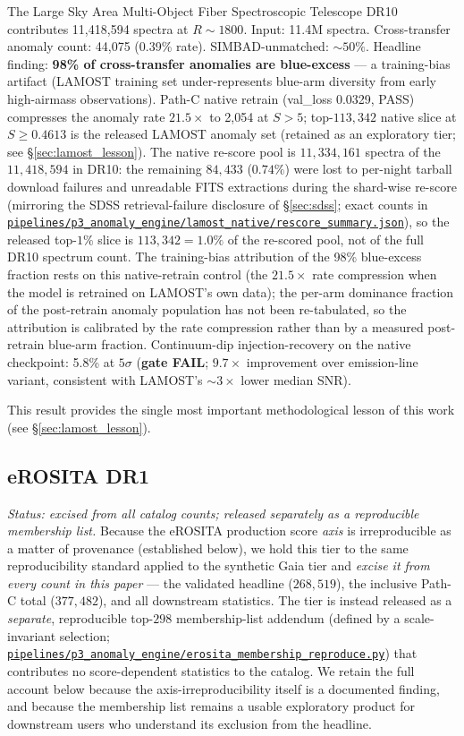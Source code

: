 \documentclass[aps,prd,twocolumn,superscriptaddress,showpacs,preprintnumbers,nofootinbib,longbibliography,floatfix]{revtex4-2}
\newcommand{\repoBase}{https://github.com/Hubify-Projects/bigbounce/blob/main}
\newcommand{\artifact}[1]{\href{\repoBase/#1}{\nolinkurl{#1}}}
\begin{document}
The Large Sky Area Multi-Object Fiber Spectroscopic Telescope DR10~\cite{LAMOST_DR10} contributes 11{,}418{,}594 spectra at $R \sim 1800$. Input: 11.4M spectra. Cross-transfer anomaly count: 44{,}075 (0.39\% rate). SIMBAD-unmatched: $\sim\!50\%$. Headline finding: \textbf{98\% of cross-transfer anomalies are blue-excess} --- a training-bias artifact (LAMOST training set under-represents blue-arm diversity from early high-airmass observations). Path-C native retrain (val\_loss 0.0329, PASS) compresses the anomaly rate $21.5\times$ to 2{,}054 at $S>5$; top-$113{,}342$ native slice at $S \geq 0.4613$ is the released LAMOST anomaly set (retained as an exploratory tier; see \S\ref{sec:lamost_lesson}). The native re-score pool is $11{,}334{,}161$ spectra of the $11{,}418{,}594$ in DR10: the remaining $84{,}433$ ($0.74\%$) were lost to per-night tarball download failures and unreadable FITS extractions during the shard-wise re-score (mirroring the SDSS retrieval-failure disclosure of \S\ref{sec:sdss}; exact counts in \artifact{pipelines/p3\_anomaly\_engine/lamost\_native/rescore\_summary.json}), so the released top-$1\%$ slice is $113{,}342 = 1.0\%$ of the re-scored pool, not of the full DR10 spectrum count. The training-bias attribution of the 98\% blue-excess fraction rests on this native-retrain control (the $21.5\times$ rate compression when the model is retrained on LAMOST's own data); the per-arm dominance fraction of the post-retrain anomaly population has not been re-tabulated, so the attribution is calibrated by the rate compression rather than by a measured post-retrain blue-arm fraction. Continuum-dip injection-recovery on the native checkpoint: 5.8\% at $5\sigma$ (\textbf{gate FAIL}; $9.7\times$ improvement over emission-line variant, consistent with LAMOST's $\sim\!3\times$ lower median SNR).

This result provides the single most important methodological lesson of this work (see \S\ref{sec:lamost_lesson}).


\subsection{eROSITA DR1}\label{sec:erosita}

\emph{Status: excised from all catalog counts; released separately as a reproducible membership list.} Because the eROSITA production score \emph{axis} is irreproducible as a matter of provenance (established below), we hold this tier to the same reproducibility standard applied to the synthetic Gaia tier and \emph{excise it from every count in this paper} --- the validated headline ($268{,}519$), the inclusive Path-C total ($377{,}482$), and all downstream statistics. The tier is instead released as a \emph{separate}, reproducible top-$298$ membership-list addendum (defined by a scale-invariant selection; \artifact{pipelines/p3\_anomaly\_engine/erosita\_membership\_reproduce.py}) that contributes no score-dependent statistics to the catalog. We retain the full account below because the axis-irreproducibility itself is a documented finding, and because the membership list remains a usable exploratory product for downstream users who understand its exclusion from the headline.
\end{document}
